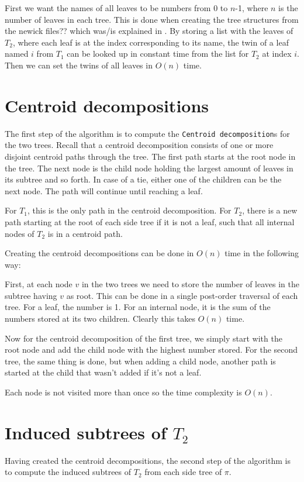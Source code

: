 First we want the names of all leaves to be numbers from 0 to $n$-1, where $n$ is the number of leaves in each tree. This is done when creating the tree structures from the newick files?? which was/is explained in . By storing a list with the leaves of $T_2$, where each leaf is at the index corresponding to its name, the twin of a leaf named $i$ from $T_1$ can be looked up in constant time from the list for $T_2$ at index $i$. Then we can set the twins of all leaves in $O(n)$ time.

\section{Centroid decompositions}
The first step of the algorithm is to compute the \texttt{Centroid decomposition}s for the two trees. Recall that a centroid decomposition consists of one or more disjoint centroid paths through the tree. The first path starts at the root node in the tree. The next node is the child node holding the largest amount of leaves in its subtree and so forth. In case of a tie, either one of the children can be the next node. The path will continue until reaching a leaf.

For $T_1$, this is the only path in the centroid decomposition. For $T_2$, there is a new path starting at the root of each side tree if it is not a leaf, such that all internal nodes of $T_2$ is in a centroid path.

Creating the centroid decompositions can be done in $O(n)$ time in the following way:

First, at each node $v$ in the two trees we need to store the number of leaves in the subtree having $v$ as root. This can be done in a single post-order traversal of each tree. For a leaf, the number is 1. For an internal node, it is the sum of the numbers stored at its two children. Clearly this takes $O(n)$ time.

Now for the centroid decomposition of the first tree, we simply start with the root node and add the child node with the highest number stored. For the second tree, the same thing is done, but when adding a child node, another path is started at the child that wasn't added if it's not a leaf.

Each node is not visited more than once so the time complexity is $O(n)$.

\section{Induced subtrees of $T_2$}
Having created the centroid decompositions, the second step of the algorithm is to compute the induced subtrees of $T_2$ from each side tree of $\pi$.

